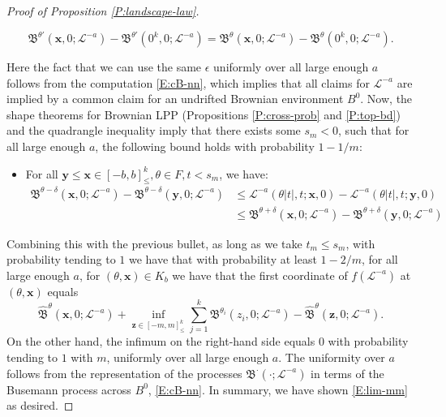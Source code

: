 \documentclass[11pt]{article}
\newcommand{\ep}{\epsilon}
\newcommand{\de}{\delta}
\newcommand{\cL}{\mathcal{L}}
\newcommand{\fB}{\mathfrak{B}}
\newcommand{\bx}{\mathbf{x}}
\newcommand{\by}{\mathbf{y}}
\newcommand{\bz}{\mathbf{z}}
\theoremstyle{definition} %
\theoremstyle{remark} %
\begin{document}
\begin{proof}[Proof of Proposition \ref{P:landscape-law}]
\begin{itemize}
	$$
	\fB^{\theta'}(\bx, 0; \cL^{-a}) - \fB^{\theta'}(0^k, 0; \cL^{-a}) = \fB^{\theta}(\bx, 0; \cL^{-a}) - \fB^{\theta}(0^k, 0; \cL^{-a}).
	$$
\end{itemize}
Here the fact that we can use the same $\ep$ uniformly over all large enough $a$ follows from the computation \eqref{E:cB-nn}, which implies that all claims for $\cL^{-a}$ are implied by a common claim for an undrifted Brownian environment $B^0$. Now, the shape theorems for Brownian LPP (Propositions \ref{P:cross-prob} and \ref{P:top-bd}) and the quadrangle inequality imply that there exists some $s_m < 0$, such that for all large enough $a$, the following bound holds with probability $1 - 1/m$:
\begin{itemize}
	\item For all $\by \le \bx \in [-b, b]^k_\le, \theta \in F, t < s_m$, we have:
	\begin{align*}
		\fB^{\theta - \de}(\bx, 0; \cL^{-a}) - \fB^{\theta - \de}(\by, 0; \cL^{-a}) &\le \cL^{-a}(\theta |t|, t ; \bx, 0) - \cL^{-a}(\theta |t|, t ; \by, 0) \\
		&\le \fB^{\theta + \de}(\bx, 0; \cL^{-a}) - \fB^{\theta + \de}(\by, 0; \cL^{-a})
	\end{align*}
\end{itemize} 
Combining this with the previous bullet, as long as we take $t_m \le s_m$, with probability tending to $1$ we have that with probability at least $1-2/m$, for all large enough $a$, for $(\theta, \bx) \in K_b$ we have that the first coordinate of $f(\cL^{-a})$ at $(\theta, \bx)$ equals
$$
\hat {\mathfrak B}^\theta (\bx, 0; \cL^{-a}) + \inf_{\bz \in [-m, m]^k_\le} \sum_{j=1}^k \mathfrak B^{\theta_i}(z_i, 0; \cL^{-a}) - \hat {\mathfrak B}^\theta(\bz, 0; \cL^{-a}).
$$
On the other hand, the infimum on the right-hand side equals $0$ with probability tending to $1$ with $m$, uniformly over all large enough $a$. The uniformity over $a$ follows from the representation of the processes $\mathfrak B^\cdot(\cdot; \cL^{-a})$ in terms of the Busemann process across $B^0$, \eqref{E:cB-nn}. In summary, we have shown \eqref{E:lim-mm} as desired. 


\end{proof}
\end{document}

